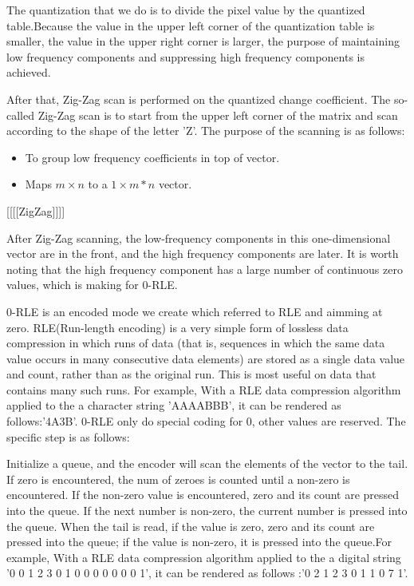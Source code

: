 \documentclass{mcmthesis}
\begin{document}
The quantization that we do is to divide the pixel value by the quantized table.Because the value in the upper left corner of the quantization table is smaller, the value in the upper right corner is larger, the purpose of maintaining low frequency components and suppressing high frequency components is achieved.

After that, Zig-Zag scan is performed on the quantized change coefficient. The so-called Zig-Zag scan is to start from the upper left corner of the matrix and scan according to the shape of the letter 'Z'. The purpose of the scanning is as follows:
\begin{itemize}
  \item To group low frequency coefficients in top of vector. 
  \item  Maps $m\times n$ to a $1\times m*n$ vector.
\end{itemize}

[[[[ZigZag]]]]

After Zig-Zag scanning, the low-frequency components in this one-dimensional vector are in the front, and the high frequency components are later. It is worth noting that the high frequency component has a large number of continuous zero values, which is making for 0-RLE.

0-RLE is an encoded mode we create which referred to RLE and aimming at zero. RLE(Run-length encoding) is a very simple form of lossless data compression in which runs of data (that is, sequences in which the same data value occurs in many consecutive data elements) are stored as a single data value and count, rather than as the original run. This is most useful on data that contains many such runs. For example, With a RLE data compression algorithm applied to the a character string 'AAAABBB', it can be rendered as follows:'4A3B'. 0-RLE only do special coding for 0, other values are reserved. The specific step is as follows:

Initialize a queue, and the encoder will scan the elements of the vector to the tail. If zero is encountered, the num of zeroes is counted until a non-zero is encountered. If the non-zero value is encountered, zero and its count are pressed into the queue. If the next number is non-zero, the current number is pressed into the queue. When the tail is read, if the value is zero, zero and its count are pressed into the queue; if the value is non-zero, it is pressed into the queue.For example, With a RLE data compression algorithm applied to the a digital string '0 0 1 2 3 0 1 0 0 0 0 0 0 0 1', it can be rendered as follows :'0 2 1 2 3 0 1 1 0 7 1'.
\end{document}
